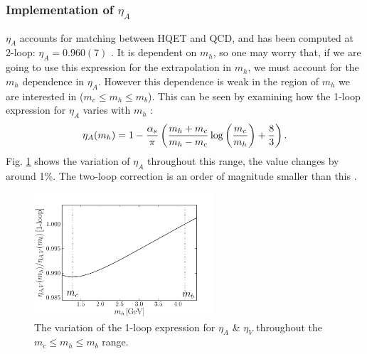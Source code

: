 
\subsubsection{Implementation of $\eta_A$}

$\eta_A$ accounts for matching between HQET and QCD, and has been computed at 2-loop: $\eta_A = 0.960(7)$ \cite{PhysRevLett.76.4124}. It is dependent on $m_h$, so one may worry that, if we are going to use this expression for the extrapolation in $m_h$, we must account for the $m_h$ dependence in $\eta_A$. However this dependence is weak in the region of $m_h$ we are interested in ($m_c \leq m_h \leq m_b$). This can be seen by examining how the 1-loop expression for $\eta_A$ varies with $m_h$ \cite{CLOSE1984209}:
\begin{align}
  \eta_A(m_h) = 1 - {\alpha_s \over \pi} \left( {m_h+m_c\over m_h-m_c} \log\left({m_c\over m_h}\right) + {8\over 3} \right).
\end{align}
Fig. \ref{fig:etaAV} shows the variation of $\eta_A$ throughout this range, the value changes by around 1\%. The two-loop correction is an order of magnitude smaller than this \cite{PhysRevLett.76.4124}.

\begin{figure}[htb!]
  \begin{center}
  \includegraphics[width=0.6\textwidth]{images/BsDsstar/etaAV.pdf}
  \caption{The variation of the 1-loop expression for $\eta_{A}$ \& $\eta_V$ throughout the $m_c \leq m_h \leq m_b$ range. \label{fig:etaAV}}
  \end{center}
  \vspace{-10pt}
\end{figure}

